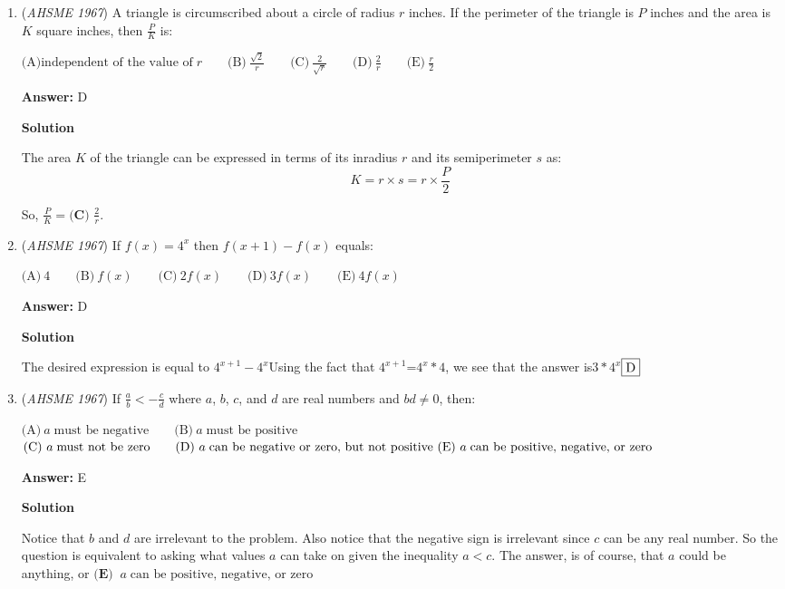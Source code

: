 \begin{enumerate}
	\item (\textit{AHSME 1967}) A triangle is circumscribed about a circle of radius $r$ inches.  If the perimeter of the triangle is $P$ inches and the area is $K$ square inches, then $\frac{P}{K}$ is:


 $\text{(A)}\text{independent of the value of} \; r\qquad\text{(B)}\ \frac{\sqrt{2}}{r}\qquad\text{(C)}\ \frac{2}{\sqrt{r}}\qquad\text{(D)}\ \frac{2}{r}\qquad\text{(E)}\ \frac{r}{2}$

 \textbf{Answer: }D



\textbf{Solution}

The area $K$ of the triangle can be expressed in terms of its inradius $r$ and its semiperimeter $s$ as:
 \[K = r \times s = r \times \frac{P}{2}\]

 So, $\frac{P}{K} = \boxed{\textbf{(C) } \frac{2}{r}}$.

 


	\item (\textit{AHSME 1967}) If $f(x)=4^x$ then $f(x+1)-f(x)$ equals:


 $\text{(A)}\ 4\qquad\text{(B)}\ f(x)\qquad\text{(C)}\ 2f(x)\qquad\text{(D)}\ 3f(x)\qquad\text{(E)}\ 4f(x)$

 \textbf{Answer: }D



\textbf{Solution}

The desired expression is equal to $4^{x+1} - 4^{x}$Using the fact that $4^{x+1}$=$4^{x}*4$, we see that the answer is$3*4^{x}$$\fbox{D}$



	\item (\textit{AHSME 1967}) If $\frac{a}{b}<-\frac{c}{d}$ where $a$, $b$, $c$, and $d$ are real numbers and $bd \not= 0$, then:


 $\text{(A)}\ a \; \text{must be negative} \qquad \text{(B)}\ a \; \text{must be positive} \qquad$
$\text{(C)}\ a \; \text{must not be zero} \qquad \text{(D)}\ a \; \text{can be negative or zero, but not positive } \\ \text{(E)}\ a \; \text{can be positive, negative, or zero}$

 \textbf{Answer: }E



\textbf{Solution}

Notice that $b$ and $d$ are irrelevant to the problem.  Also notice that the negative sign is irrelevant since $c$ can be any real number.  So the question is equivalent to asking what values $a$ can take on given the inequality $a<c$.  The answer, is of course, that $a$ could be anything, or $\boxed{\textbf{(E) } \ a \; \text{can be positive, negative, or zero}}$




\end{enumerate}
